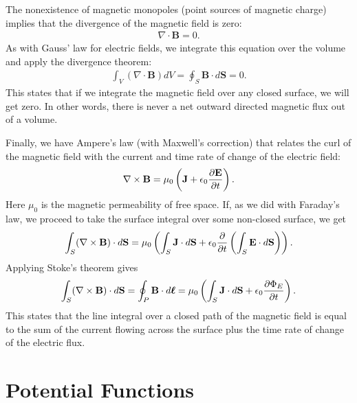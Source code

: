 The nonexistence of magnetic monopoles (point sources of magnetic charge) implies that the divergence of the magnetic field is zero:
\begin{align}
  \nabla \cdot \mathbf{B} = 0.
\end{align}
As with Gauss' law for electric fields, we integrate this equation over the volume and apply the divergence theorem:
\begin{align}
  \int_V ( \nabla \cdot \mathbf{B} ) dV = \oint_S \mathbf{B} \cdot d\mathbf{S} = 0 .
\end{align}
This states that if we integrate the magnetic field over any closed surface, we will get zero. In other words, there is never a net outward directed magnetic flux out of a volume.

Finally, we have Ampere's law (with Maxwell's correction) that relates the curl of the magnetic field with the current and time rate of change of the electric field:
\begin{align}
  \nabla \times \mathbf{B} = \mu_0 \left( \mathbf{J} + \epsilon_0 \frac{ \partial {\mathbf{E}} }{ \partial {t} } \right).
\end{align}
Here $\mu_0$ is the magnetic permeability of free space. If, as we did with Faraday's law, we proceed to take the surface integral over some non-closed surface, we get
\begin{align}
  \int_S ( \nabla \times \mathbf{B} ) \cdot d \mathbf{S} = \mu_0 \left( \int_S \mathbf{J} \cdot d\mathbf{S} 
  + \epsilon_0 \frac{ \partial {} }{ \partial {t} } \left( \int_S \mathbf{E} \cdot d\mathbf{S} \right) \right).
\end{align}
Applying Stoke's theorem gives
\begin{align}
  \int_S ( \nabla \times \mathbf{B} ) \cdot d \mathbf{S} = \oint_P \mathbf{B} \cdot d\boldsymbol\ell = \mu_0 \left( \int_S \mathbf{J} \cdot d\mathbf{S} 
  + \epsilon_0 \frac{ \partial {\Phi_E} }{ \partial {t} }  \right).
\end{align}
This states that the line integral over a closed path of the magnetic field is equal to the sum of the current flowing across the surface plus the time rate of change of the electric flux.

\section{Potential Functions}

